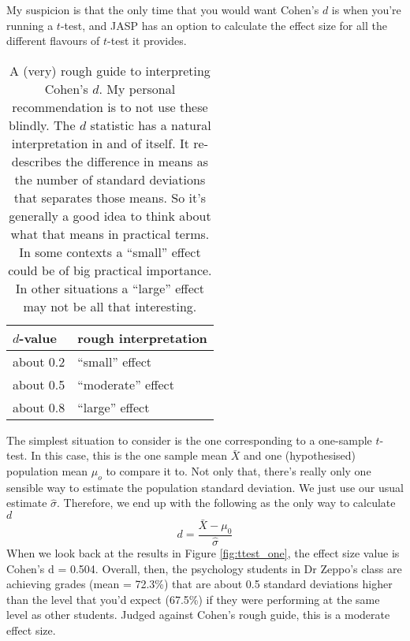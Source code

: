 My suspicion is that the only time that you would want Cohen's $d$ is when you're running a $t$-test, and JASP has an option to calculate the effect size for all the different flavours of $t$-test it provides. 

\begin{table}[t]
\caption{A (very) rough guide to interpreting Cohen's $d$. My personal recommendation is to not use these blindly. The $d$ statistic has a natural interpretation in and of itself. It re-describes the difference in means as the number of standard deviations that separates those means. So it's generally a good idea to think about what that means in practical terms. In some contexts a ``small'' effect could be of big practical importance. In other situations a ``large'' effect may not be all that interesting.} 
\label{tab:cohensdinterpretation}
\centering
\vspace*{6pt}
\begin{tabular}{l|l}
$d$-value & rough interpretation \\ \hline
about 0.2 & ``small'' effect  \\
about 0.5 & ``moderate'' effect \\
about 0.8 & ``large'' effect 
\end{tabular}
\vspace*{6pt}
\HR
\end{table}


The simplest situation to consider is the one corresponding to a one-sample $t$-test. In this case, this is the one sample mean $\bar{X}$ and one (hypothesised) population mean $\mu_o$ to compare it to. Not only that, there's really only one sensible way to estimate the population standard deviation. We just use our usual estimate $\hat{\sigma}$. Therefore, we end up with the following as the only way to calculate $d$
$$
d = \frac{\bar{X} - \mu_0}{\hat{\sigma}}
$$
When we look back at the results in Figure \ref{fig:ttest_one}, the effect size value is Cohen's d = 0.504. Overall, then, the psychology students in Dr Zeppo's class are achieving grades (mean = 72.3\%) that are about 0.5 standard deviations higher than the level that you'd expect (67.5\%) if they were performing at the same level as other students. Judged against Cohen's rough guide, this is a moderate effect size.



